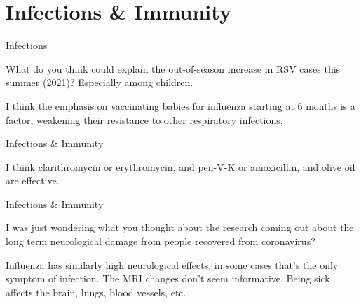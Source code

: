 \documentclass[11pt,oneside,openany,extrafontsizes]{memoir}
\begin{document}
\section{Infections \& Immunity}

\begin{qaexchange}{Infections}

    \begin{question}
        What do you think could explain the out-of-season increase in RSV cases this summer (2021)? Especially among children.
    \end{question}

    \begin{answer}
       I think the emphasis on vaccinating babies for influenza starting at 6 months is a factor, weakening their resistance to other respiratory infections.
    \end{answer}
\end{qaexchange}

\begin{standalonequote}{Infections \& Immunity}

    \begin{answer}
       I think clarithromycin or erythromycin, and pen-V-K or amoxicillin, and olive oil are effective.
    \end{answer}
\end{standalonequote}

\begin{qaexchange}{Infections \& Immunity}

    \begin{question}
        I was just wondering what you thought about the research coming out about the long term neurological damage from people recovered from coronavirus?
    \end{question}

    \begin{answer}
      Influenza has similarly high neurological effects, in some cases that's the only symptom of infection. The MRI changes don't seem informative. Being sick affects the brain, lungs, blood vessels, etc.
    \end{answer}
\end{qaexchange}
\end{document}
